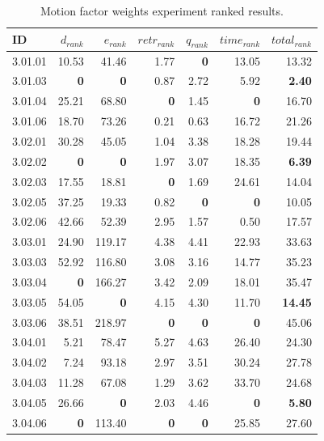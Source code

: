 \begin{table}[ht]
\centering
\footnotesize
\caption{Motion factor weights experiment ranked results.}
\label{tab:motion_weights_ranked}
\begin{tabular}{@{}lrrrrrr@{}}
\hline
    ID & $d_{rank}$ & $e_{rank}$ & $retr_{rank}$ & $q_{rank}$ & $time_{rank}$ & $total_{rank}$ \\
\hline
    3.01.01 & 10.53 & 41.46 & 1.77 & \textbf{0} & 13.05 & 13.32 \\
    3.01.03 & \textbf{0} & \textbf{0} & 0.87 & 2.72 & 5.92 & \textbf{2.40} \\
    3.01.04 & 25.21 & 68.80 & \textbf{0} & 1.45 & \textbf{0} & 16.70 \\
    3.01.06 & 18.70 & 73.26 & 0.21 & 0.63 & 16.72 & 21.26 \\
    \noalign{\smallskip}
    3.02.01 & 30.28 & 45.05 & 1.04 & 3.38 & 18.28 & 19.44 \\
    3.02.02 & \textbf{0} & \textbf{0} & 1.97 & 3.07 & 18.35 & \textbf{6.39} \\
    3.02.03 & 17.55 & 18.81 & \textbf{0} & 1.69 & 24.61 & 14.04 \\
    3.02.05 & 37.25 & 19.33 & 0.82 & \textbf{0} & \textbf{0} & 10.05 \\
    3.02.06 & 42.66 & 52.39 & 2.95 & 1.57 & 0.50 & 17.57 \\
    \noalign{\smallskip}
    3.03.01 & 24.90 & 119.17 & 4.38 & 4.41 & 22.93 & 33.63 \\
    3.03.03 & 52.92 & 116.80 & 3.08 & 3.16 & 14.77 & 35.23 \\
    3.03.04 & \textbf{0} & 166.27 & 3.42 & 2.09 & 18.01 & 35.47 \\
    3.03.05 & 54.05 & \textbf{0} & 4.15 & 4.30 & 11.70 & \textbf{14.45} \\
    3.03.06 & 38.51 & 218.97 & \textbf{0} & \textbf{0} & \textbf{0} & 45.06 \\
    \noalign{\smallskip}
    3.04.01 & 5.21 & 78.47 & 5.27 & 4.63 & 26.40 & 24.30 \\
    3.04.02 & 7.24 & 93.18 & 2.97 & 3.51 & 30.24 & 27.78 \\
    3.04.03 & 11.28 & 67.08 & 1.29 & 3.62 & 33.70 & 24.68 \\
    3.04.05 & 26.66 & \textbf{0} & 2.03 & 4.46 & \textbf{0} & \textbf{5.80} \\
    3.04.06 & \textbf{0} & 113.40 & \textbf{0} & \textbf{0} & 25.85 & 27.60 \\
\hline
\end{tabular}
\end{table}